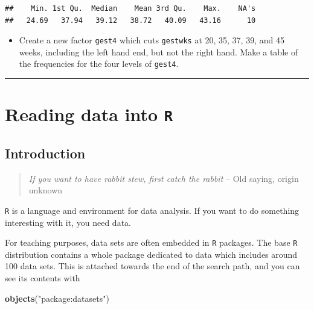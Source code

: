 \documentclass[
]{book}
\newenvironment{Shaded}{\begin{snugshade}}{\end{snugshade}}
\newcommand{\FunctionTok}[1]{\textcolor[rgb]{0.13,0.29,0.53}{\textbf{#1}}}
\newcommand{\NormalTok}[1]{#1}
\newcommand{\StringTok}[1]{\textcolor[rgb]{0.31,0.60,0.02}{#1}}
\providecommand{\tightlist}{%
  \setlength{\itemsep}{0pt}\setlength{\parskip}{0pt}}
\begin{document}
\begin{verbatim}
##    Min. 1st Qu.  Median    Mean 3rd Qu.    Max.    NA's 
##   24.69   37.94   39.12   38.72   40.09   43.16      10
\end{verbatim}

\begin{itemize}
\tightlist
\item
  Create a new factor \texttt{gest4} which cuts \texttt{gestwks} at 20,
  35, 37, 39, and 45 weeks, including the left hand end, but not the
  right hand. Make a table of the frequencies for the four levels of \texttt{gest4}.
\end{itemize}

\begin{center}\rule{0.5\linewidth}{0.5pt}\end{center}

\chapter{\texorpdfstring{Reading data into \texttt{R}}{Reading data into R}}\label{reading-data-into-r}

\section{Introduction}\label{introduction}

\begin{quote}
\emph{If you want to have rabbit stew, first catch the rabbit} -- Old saying, origin unknown
\end{quote}

\texttt{R} is a language and environment for data analysis. If you
want to do something interesting with it, you need data.

For teaching purposes, data sets are often embedded in \texttt{R}
packages. The base \texttt{R} distribution contains a whole package
dedicated to data which includes around 100 data sets. This is
attached towards the end of the search path, and you can see its
contents with

\begin{Shaded}
\begin{Highlighting}[]
\FunctionTok{objects}\NormalTok{(}\StringTok{"package:datasets"}\NormalTok{)}
\end{Highlighting}
\end{Shaded}
\end{document}
